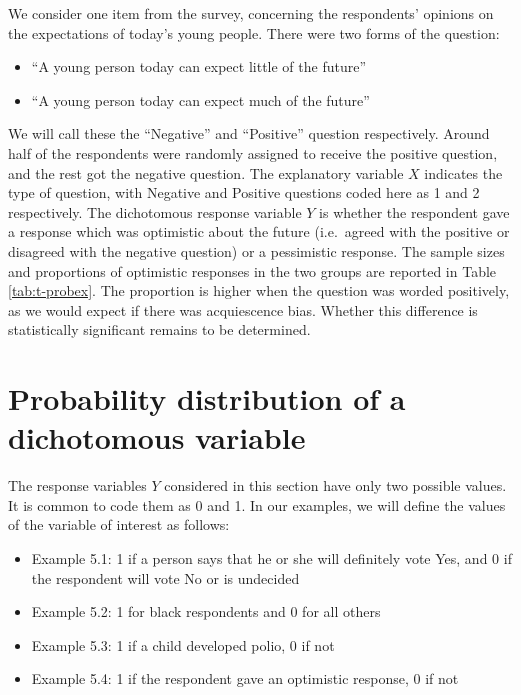 \documentclass[11pt,a4paper,openany]{book}
\begin{document}
We consider one item from the survey, concerning the respondents'
opinions on the expectations of today's young people. There were two
forms of the question:

\begin{itemize}
\item
  ``A young person today can expect little of the future''
\item
  ``A young person today can expect much of the future''
\end{itemize}

We will call these the ``Negative'' and ``Positive'' question
respectively. Around half of the respondents were randomly assigned to
receive the positive question, and the rest got the negative question.
The explanatory variable \(X\) indicates the type of question, with
Negative and Positive questions coded here as 1 and 2 respectively. The
dichotomous response variable \(Y\) is whether the respondent gave a
response which was optimistic about the future (i.e.~agreed with the
positive or disagreed with the negative question) or a pessimistic
response. The sample sizes and proportions of optimistic responses in
the two groups are reported in Table \ref{tab:t-probex}. The proportion
is higher when the question was worded positively, as we would expect if
there was acquiescence bias. Whether this difference is statistically
significant remains to be determined.

\section{Probability distribution of a dichotomous
variable}\label{s-probs-distribution}

The response variables \(Y\) considered in this section have only two
possible values. It is common to code them as 0 and 1. In our examples,
we will define the values of the variable of interest as follows:

\begin{itemize}
\item
  Example 5.1: 1 if a person says that he or she will definitely vote
  Yes, and 0 if the respondent will vote No or is undecided
\item
  Example 5.2: 1 for black respondents and 0 for all others
\item
  Example 5.3: 1 if a child developed polio, 0 if not
\item
  Example 5.4: 1 if the respondent gave an optimistic response, 0 if not
\end{itemize}
\end{document}
